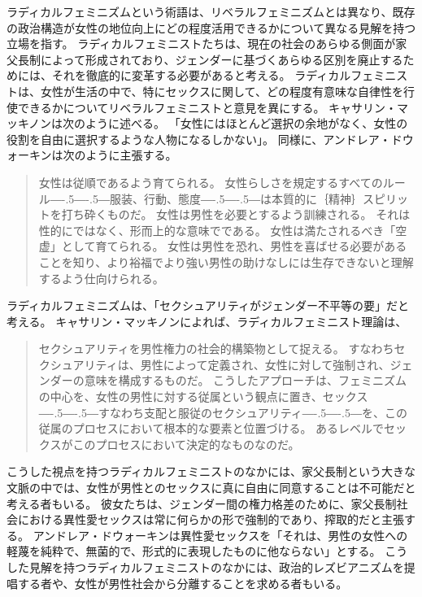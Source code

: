 \documentclass[paper=a4,book,openany]{jlreq}
\newcommand{\ig}[1]{}           %
\def\DDASH{―\kern-.5\zw―\kern-.5\zw―} %
\begin{document}
ラディカルフェミニズムという術語は、リベラルフェミニズムとは異なり、既存の政治構造が女性の地位向上にどの程度活用できるかについて異なる見解を持つ立場を指す。
ラディカルフェミニストたちは、現在の社会のあらゆる側面が家父長制によって形成されており、ジェンダーに基づくあらゆる区別を廃止するためには、それを徹底的に変革する必要があると考える。
ラディカルフェミニストは、女性が生活の中で、特にセックスに関して、どの程度有意味な自律性を行使できるかについてリベラルフェミニストと意見を異にする。
キャサリン・マッキノンは次のように述べる。
「女性にはほとんど選択の余地がなく、女性の役割を自由に選択するような人物になるしかない」\citep[p.124]{mackinnon89:_towar_femin_theor_of_state}。
同様に、アンドレア・ドウォーキンは次のように主張する。
\ig{Andrea Dworkin}

\begin{quote}
  女性は従順であるよう育てられる。
女性らしさを規定するすべてのルール{\DDASH}服装、行動、態度{\DDASH}は本質的に｛精神｝{スピリット}を打ち砕くものだ。
女性は男性を必要とするよう訓練される。
それは性的にではなく、形而上的な意味でである。
女性は満たされるべき「空虚」として育てられる。
女性は男性を恐れ、男性を喜ばせる必要があることを知り、より裕福でより強い男性の助けなしには生存できないと理解するよう仕向けられる。
\citep[p.81]{dworkin83:_righ_wing_women}
\end{quote}

ラディカルフェミニズムは、「セクシュアリティがジェンダー不平等の要」だと考える。
キャサリン・マッキノンによれば、ラディカルフェミニスト理論は、
\begin{quote}
セクシュアリティを男性権力の社会的構築物として捉える。
すなわちセクシュアリティは、男性によって定義され、女性に対して強制され、ジェンダーの意味を構成するものだ。
こうしたアプローチは、フェミニズムの中心を、女性の男性に対する従属という観点に置き、セックス{\DDASH}すなわち支配と服従のセクシュアリティ{\DDASH}を、この従属のプロセスにおいて根本的な要素と位置づける。
あるレベルでセックスがこのプロセスにおいて決定的なものなのだ。
\citep[p.128]{mackinnon89:_towar_femin_theor_of_state}
\end{quote}

こうした視点を持つラディカルフェミニストのなかには、家父長制という大きな文脈の中では、女性が男性とのセックスに真に自由に同意することは不可能だと考える者もいる。
彼女たちは、ジェンダー間の権力格差のために、家父長制社会における異性愛セックスは常に何らかの形で強制的であり、搾取的だと主張する。
アンドレア・ドウォーキンは異性愛セックスを「それは、男性の女性への軽蔑を純粋で、無菌的で、形式的に表現したものに他ならない」とする\citep[p.138]{dworkin87:_inter}。
\ig{Andrea Dworkin}こうした見解を持つラディカルフェミニストのなかには、政治的レズビアニズムを提唱する者や、女性が男性社会から分離することを求める者もいる。
\end{document}
